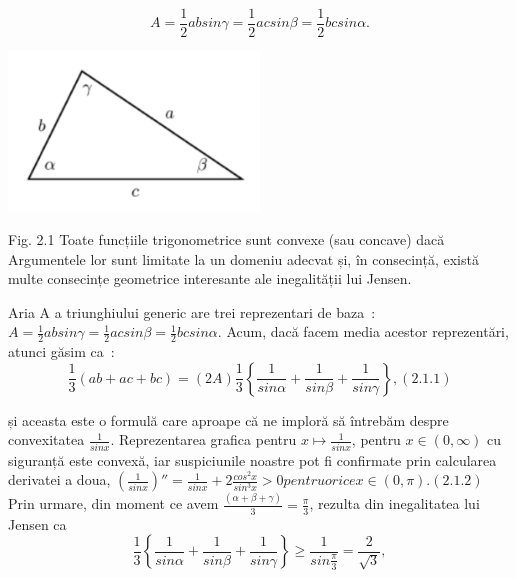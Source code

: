 \documentclass[a4paper,12pt,oneside]{report}
\begin{document}
\begin{displaymath}
  A = \frac{1}{2}ab sin\gamma = \frac{1}{2}ac sin \beta = \frac{1}{2}bc sin \alpha. 
\end{displaymath}

\begin{center}
	\includegraphics[width=0.5\textwidth]{fig2.1.png}
\end{center}

Fig. 2.1 Toate funcțiile trigonometrice sunt convexe (sau concave) dacă
Argumentele lor sunt limitate la un domeniu adecvat și, în consecință,
există multe consecințe geometrice interesante ale inegalității lui Jensen.

Aria A a triunghiului generic are trei reprezentari de baza :
\(A = \frac{1}{2}ab sin\gamma = \frac{1}{2}ac sin \beta = \frac{1}{2}bc sin \alpha. \)
Acum, dacă facem media acestor reprezentări, atunci găsim ca :
\begin{displaymath}
  \frac{1}{3}\left ( ab + ac + bc \right )= \left ( 2A \right )\frac{1}{3}\left \{ \frac{1}{sin \alpha } + \frac{1}{sin \beta } + \frac{1}{sin \gamma }\right \}, (2.1.1)
\end{displaymath}

și aceasta este o formulă care aproape că ne imploră să întrebăm despre convexitatea \(\frac{1}{sin x}\). Reprezentarea grafica pentru \(x \mapsto \frac{1}{sin x}\), pentru \(x\in \left ( 0 , \infty  \right )\) cu siguranță este convexă, iar suspiciunile noastre pot fi confirmate prin calcularea derivatei a doua, \({\left ( \frac{1}{sin x} \right )}''= \frac{1}{sin x} + 2\frac{cos^{2}x}{sin ^{3}x}> 0 pentru orice x\in \left ( 0, \pi  \right ) . (2.1.2)\)
	Prin urmare, din moment ce avem \(\frac{\left ( \alpha + \beta  + \gamma  \right )}{3}= \frac{\pi }{3}\), rezulta din inegalitatea lui Jensen ca 
\begin{displaymath}
  \frac{1}{3}\left \{ \frac{1}{sin \alpha }  + \frac{1}{sin \beta } + \frac{1}{sin \gamma }\right \}\geq \frac{1}{sin \frac{\pi }{3}} =  \frac{2}{\sqrt{3}}, 
\end{displaymath}
\end{document}
